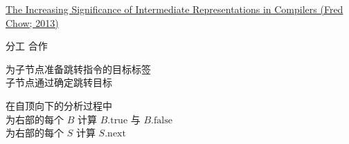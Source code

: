 

\begin{frame}{}
  \begin{center}
    \href{https://dl.acm.org/doi/pdf/10.1145/2542661.2544374}{The Increasing Significance of Intermediate Representations in Compilers (Fred Chow; 2013)}
  \end{center}
\end{frame}

\begin{frame}
\end{frame}

\begin{frame}{}
  \begin{center}
    {\Large 分工 \qquad 合作}

    \vspace{0.30cm}
  \end{center}

  \pause
  \begin{center}
    为子节点准备跳转指令的目标标签 \\[5pt]
    子节点通过确定跳转目标
  \end{center}
\end{frame}

\begin{frame}{}
  \begin{center}
    在自顶向下的分析过程中 \\[15pt]

    为右部的每个 $B$ 计算 $B.\text{true}$ 与 $B.\text{false}$ \\[10pt]
    为右部的每个 $S$ 计算 $S.\text{next}$
  \end{center}
\end{frame}

\begin{frame}{}
\end{frame}
